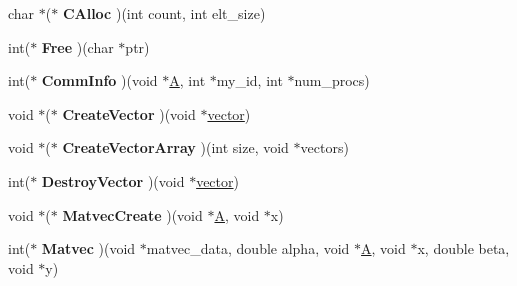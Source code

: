 \begin{DoxyCompactItemize}
\item 
\hypertarget{structhypre__GMRESFunctions_a2e3bec7e3fea7756e51c0e8f468f3a22}{}char $\ast$($\ast$ {\bfseries C\+Alloc} )(int count, int elt\+\_\+size)\label{structhypre__GMRESFunctions_a2e3bec7e3fea7756e51c0e8f468f3a22}

\item 
\hypertarget{structhypre__GMRESFunctions_aac14e602b7dc705d478bda566a36f20e}{}int($\ast$ {\bfseries Free} )(char $\ast$ptr)\label{structhypre__GMRESFunctions_aac14e602b7dc705d478bda566a36f20e}

\item 
\hypertarget{structhypre__GMRESFunctions_aa224ae03c721e044c6bd4d95c9fc98ac}{}int($\ast$ {\bfseries Comm\+Info} )(void $\ast$\hyperlink{structA}{A}, int $\ast$my\+\_\+id, int $\ast$num\+\_\+procs)\label{structhypre__GMRESFunctions_aa224ae03c721e044c6bd4d95c9fc98ac}

\item 
\hypertarget{structhypre__GMRESFunctions_a86eaa9c3563f4db0c3f8573ba08d016d}{}void $\ast$($\ast$ {\bfseries Create\+Vector} )(void $\ast$\hyperlink{structvector}{vector})\label{structhypre__GMRESFunctions_a86eaa9c3563f4db0c3f8573ba08d016d}

\item 
\hypertarget{structhypre__GMRESFunctions_ad467279fb685b8b0404f1c41adfb59fd}{}void $\ast$($\ast$ {\bfseries Create\+Vector\+Array} )(int size, void $\ast$vectors)\label{structhypre__GMRESFunctions_ad467279fb685b8b0404f1c41adfb59fd}

\item 
\hypertarget{structhypre__GMRESFunctions_a8b0536e9b64af764d6a20e035b0bfbc4}{}int($\ast$ {\bfseries Destroy\+Vector} )(void $\ast$\hyperlink{structvector}{vector})\label{structhypre__GMRESFunctions_a8b0536e9b64af764d6a20e035b0bfbc4}

\item 
\hypertarget{structhypre__GMRESFunctions_afa8292d45d83ed3186dd4b874501930f}{}void $\ast$($\ast$ {\bfseries Matvec\+Create} )(void $\ast$\hyperlink{structA}{A}, void $\ast$x)\label{structhypre__GMRESFunctions_afa8292d45d83ed3186dd4b874501930f}

\item 
\hypertarget{structhypre__GMRESFunctions_a77837dd3108dd415e456175304001bbd}{}int($\ast$ {\bfseries Matvec} )(void $\ast$matvec\+\_\+data, double alpha, void $\ast$\hyperlink{structA}{A}, void $\ast$x, double beta, void $\ast$y)\label{structhypre__GMRESFunctions_a77837dd3108dd415e456175304001bbd}


\end{DoxyCompactItemize}
